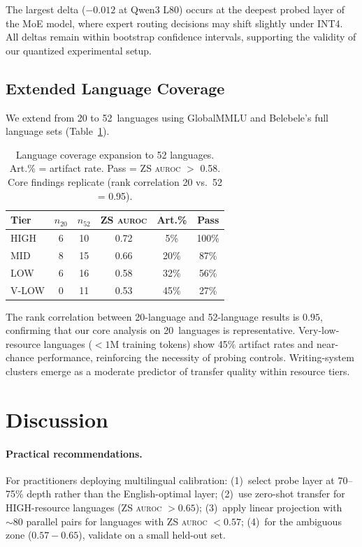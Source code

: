\documentclass[11pt,a4paper]{article}
\newcommand{\aur}{\textsc{auroc}}
\begin{document}
The largest delta ($-0.012$ at Qwen3 L80) occurs at the deepest probed layer of the MoE model, where expert routing decisions may shift slightly under INT4. All deltas remain within bootstrap confidence intervals, supporting the validity of our quantized experimental setup.

\subsection{Extended Language Coverage}
\label{sec:extended}

We extend from 20 to 52~languages using GlobalMMLU and Belebele's full language sets (Table~\ref{tab:extended}).

\begin{table}[t]
\centering
\small
\begin{tabular}{lccccc}
\toprule
\textbf{Tier} & \textbf{$n_{20}$} & \textbf{$n_{52}$} & \textbf{ZS \aur{}} & \textbf{Art.\%} & \textbf{Pass} \\
\midrule
HIGH & 6 & 10 & 0.72 & 5\% & 100\% \\
MID & 8 & 15 & 0.66 & 20\% & 87\% \\
LOW & 6 & 16 & 0.58 & 32\% & 56\% \\
V-LOW & 0 & 11 & 0.53 & 45\% & 27\% \\
\bottomrule
\end{tabular}
\caption{Language coverage expansion to 52 languages. Art.\% = artifact rate. Pass = ZS \aur{} $>$ 0.58. Core findings replicate (rank correlation 20 vs.\ 52 = 0.95).}
\label{tab:extended}
\end{table}

The rank correlation between 20-language and 52-language results is $0.95$, confirming that our core analysis on 20~languages is representative. Very-low-resource languages ($< 1$M training tokens) show 45\% artifact rates and near-chance performance, reinforcing the necessity of probing controls. Writing-system clusters emerge as a moderate predictor of transfer quality within resource tiers.

\section{Discussion}

\paragraph{Practical recommendations.}
For practitioners deploying multilingual calibration: (1)~select probe layer at 70--75\% depth rather than the English-optimal layer; (2)~use zero-shot transfer for HIGH-resource languages (ZS \aur{} $> 0.65$); (3)~apply linear projection with ${\sim}80$ parallel pairs for languages with ZS \aur{} $< 0.57$; (4)~for the ambiguous zone ($0.57{-}0.65$), validate on a small held-out set.
\end{document}
